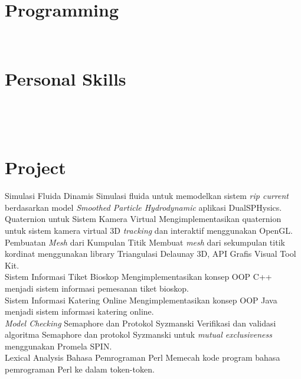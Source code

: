 \documentclass[]{friggeri-cv}
\begin{document}
\begin{aside}
  \section{Programming}
    ~
  \section{Personal Skills}
    ~
\end{aside}
~
\section{Project}
\begin{entrylist}
  \entry
    {}
    {Simulasi Fluida Dinamis}
    {}
    {Simulasi fluida untuk memodelkan sistem \textit{rip current} berdasarkan model \textit{Smoothed Particle Hydrodynamic} aplikasi DualSPHysics.\\}
  \entry
    {}
    {Quaternion untuk Sistem Kamera Virtual}
    {}
    {Mengimplementasikan quaternion untuk sistem kamera virtual 3D \textit{tracking} dan interaktif menggunakan OpenGL.\\}
  \entry
   {}
   {Pembuatan \textit{Mesh} dari Kumpulan Titik}
   {}
   {Membuat \textit{mesh} dari sekumpulan titik kordinat menggunakan library Triangulasi Delaunay 3D, API Grafis Visual Tool Kit.\\}
  \entry
    {}
    {Sistem Informasi Tiket Bioskop}
    {}
    {Mengimplementasikan konsep OOP C++ menjadi sistem informasi pemesanan tiket bioskop.\\}
  \entry
    {}
    {Sistem Informasi Katering Online}
    {}
    {Mengimplementasikan konsep OOP Java menjadi sistem informasi katering online.\\}
  \entry
	{}
	{\textit{Model Checking} Semaphore dan Protokol Syzmanski}
	{}
	{Verifikasi dan validasi algoritma Semaphore dan protokol Syzmanski untuk \textit{mutual exclusiveness} menggunakan Promela SPIN.\\}
  \entry
	{}
	{Lexical Analysis Bahasa Pemrograman Perl}
	{}
	{Memecah kode program bahasa pemrograman Perl ke dalam token-token.\\}
  


\end{entrylist}
\\
\end{document}
